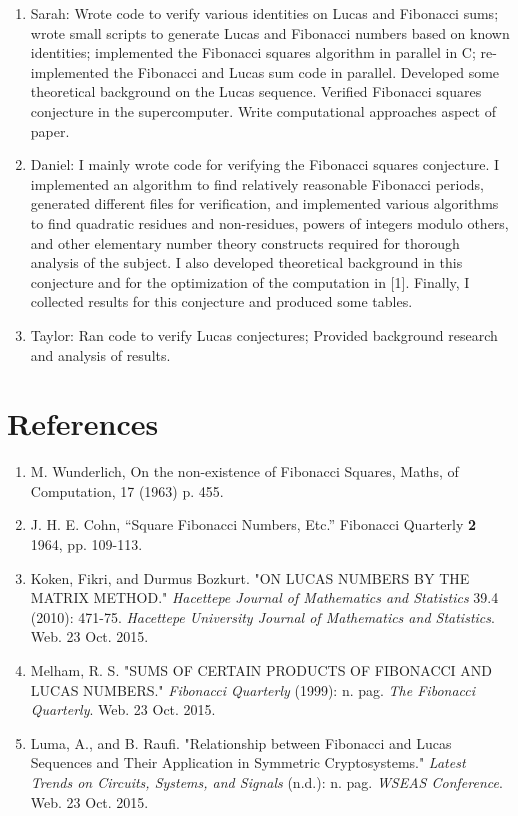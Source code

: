 \documentclass[11pt]{article}
\begin{document}
\begin{enumerate}
\item Sarah: Wrote code to verify various identities on Lucas and Fibonacci sums; wrote small scripts to generate Lucas and Fibonacci numbers based on known identities; implemented the Fibonacci squares algorithm in parallel in C; re-implemented the Fibonacci and Lucas sum code in parallel. Developed some theoretical background on the Lucas sequence. Verified Fibonacci squares conjecture in the supercomputer. Write computational approaches aspect of paper.

\item Daniel: I mainly wrote code for verifying the Fibonacci squares conjecture. I implemented an algorithm to find relatively reasonable Fibonacci periods, generated different files for verification, and implemented various algorithms to find quadratic residues and non-residues, powers of integers modulo others, and other elementary number theory constructs required for thorough analysis of the subject. I also developed theoretical background in this conjecture and for the optimization of the computation in [1]. Finally, I collected results for this conjecture and produced some tables.

\item Taylor: Ran code to verify Lucas conjectures; Provided background research and analysis of results. 
\end{enumerate}

\section{References}

\begin{enumerate}
\item M. Wunderlich, On the non-existence of Fibonacci Squares, Maths, of Computation, 17 (1963) p. 455. 

\item J. H. E. Cohn, ``Square Fibonacci Numbers, Etc.'' Fibonacci Quarterly \textbf{2} 1964, pp. 109-113.

\item Koken, Fikri, and Durmus Bozkurt. "ON LUCAS NUMBERS BY THE MATRIX METHOD." \textit{Hacettepe Journal of Mathematics and Statistics} 39.4 (2010): 471-75. \textit{Hacettepe University Journal of Mathematics and Statistics}. Web. 23 Oct. 2015.

\item Melham, R. S. "SUMS OF CERTAIN PRODUCTS OF FIBONACCI AND LUCAS NUMBERS." \textit{Fibonacci Quarterly} (1999): n. pag. \textit{The Fibonacci Quarterly}. Web. 23 Oct. 2015.

\item Luma, A., and B. Raufi. "Relationship between Fibonacci and Lucas Sequences and Their Application in Symmetric Cryptosystems." \textit{Latest Trends on Circuits, Systems, and Signals} (n.d.): n. pag. \textit{WSEAS Conference}. Web. 23 Oct. 2015.
\end{enumerate}
\end{document}
